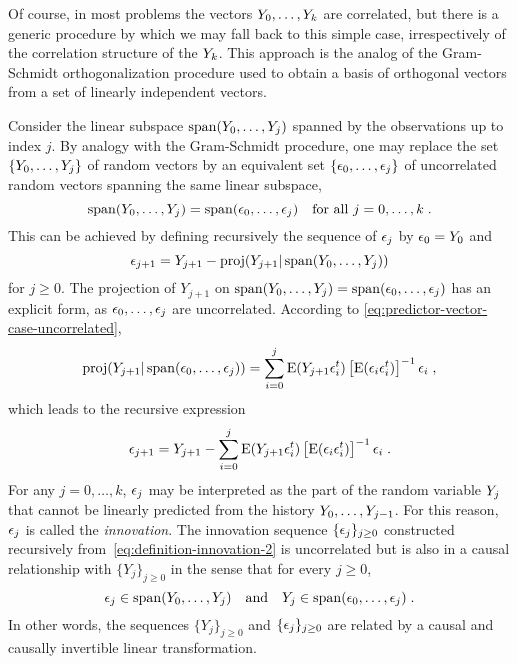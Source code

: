 Of course, in most problems the vectors $Y_0, \ldots, Y_k$ are correlated,
but there is a generic procedure by which we may fall back to this simple
case, irrespectively of the correlation structure of the $Y_k$. This approach
is the analog of the  Gram-Schmidt orthogonalization procedure used to obtain
a basis of orthogonal vectors from a set of linearly independent vectors.

Consider the linear subspace $\operatorname{span}(Y_0, \ldots, Y_j)$
spanned by the observations up to index $j$. By analogy with the
Gram-Schmidt procedure, one may replace the set $\{Y_0,\ldots, Y_j\}$
of random vectors by an equivalent set $\{ \epsilon_0, \ldots,\epsilon_j\}$
of uncorrelated random vectors spanning the same linear subspace,
\begin{equation}
\label{eq:gram-schmidt}
\operatorname{span}(Y_0, \ldots, Y_j) = \operatorname{span}(\epsilon_0, \ldots, \epsilon_j) \quad \text{for all $j=0, \ldots, k$} \; .
\end{equation}
This can be achieved by defining recursively the sequence of $\epsilon_j$ by $\epsilon_0 = Y_0$ and
\begin{equation}
\label{eq:definition-innovation}
\epsilon_{j+1} = Y_{j+1} - \operatorname{proj}({Y_{j+1}}|\operatorname{span}(Y_0, \ldots, Y_j))
\end{equation}
for $j \geq 0$. The projection of $Y_{j+1}$ on
$\operatorname{span}(Y_0, \ldots, Y_j) = \operatorname{span}(\epsilon_0, \ldots, \epsilon_j)$ has an
explicit form, as $\epsilon_0, \dots, \epsilon_j$ are uncorrelated. According to \eqref{eq:predictor-vector-case-uncorrelated},
\begin{equation}
\label{eq:projection-formula}
\operatorname{proj}({Y_{j+1}}|\operatorname{span}(\epsilon_0, \ldots, \epsilon_j)) = \sum_{i=0}^{j} \operatorname{E}(Y_{j+1} \epsilon_i^t) \left[ \operatorname{E}(\epsilon_i \epsilon_i^t) \right]^{-1} \epsilon_i \; ,
\end{equation}
which leads to the recursive expression
\begin{equation}
\label{eq:definition-innovation-2}
\epsilon_{j+1} = Y_{j+1} - \sum_{i=0}^{j} \operatorname{E}(Y_{j+1} \epsilon_i^t) \left[ \operatorname{E}(\epsilon_i \epsilon_i^t) \right]^{-1} \epsilon_i \; .
\end{equation}
For any $j=0, \ldots, k$, $\epsilon_j$ may be interpreted as the part of the
random variable $Y_j$ that cannot be linearly predicted from the history
$Y_0, \ldots, Y_{j-1}$. For this reason, $\epsilon_j$ is called the
 \textit{innovation}. The innovation sequence
$\{\epsilon_j\}_{j \geq 0}$ constructed recursively
from~\eqref{eq:definition-innovation-2} is uncorrelated but is also in a causal
relationship with $\{Y_j\}_{j \geq 0}$ in the sense that for every $j \geq
0$,
\begin{equation}
\label{eq:causal-innovation}
\epsilon_j \in \operatorname{span}(Y_0, \ldots, Y_j) \quad \text{and} \quad Y_j \in \operatorname{span}(\epsilon_0, \ldots, \epsilon_j) \; .
\end{equation}
In other words, the sequences $\{Y_j\}_{j \geq 0}$ and $\{ \epsilon_j
\}_{j \geq 0}$ are related by a causal and causally invertible linear
transformation.

